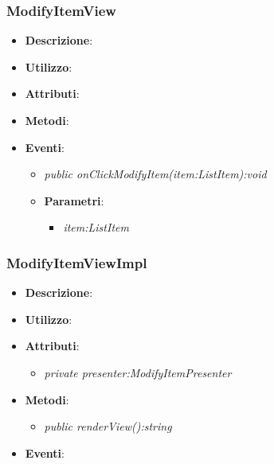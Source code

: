 \subsubsection{ModifyItemView}
\begin{itemize}
\item \textbf{Descrizione}: 
\item \textbf{Utilizzo}:
\item \textbf{Attributi}: 
\item \textbf{Metodi}:
\item \textbf{Eventi}:
	\begin{itemize}
	\item \textit{public onClickModifyItem(item:ListItem):void}\\

			\item{\textbf{Parametri}: \begin{itemize}
			\item \textit{item:ListItem}\\

			\end{itemize}}
	\end{itemize}
\end{itemize}

\subsubsection{ModifyItemViewImpl}
\begin{itemize}
\item \textbf{Descrizione}: 
\item \textbf{Utilizzo}:
\item \textbf{Attributi}: 
	\begin{itemize}
	\item \textit{private presenter:ModifyItemPresenter}\\
	
	\end{itemize}
\item \textbf{Metodi}:
	\begin{itemize}
	\item \textit{public renderView():string}\\

	\end{itemize}
\item \textbf{Eventi}:
\end{itemize}

